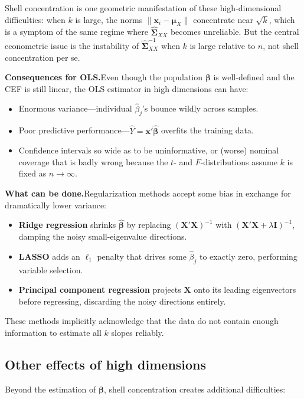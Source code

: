 \documentclass[11pt]{article}
\begin{document}
\medskip\noindent
Shell concentration is one geometric manifestation of these high-dimensional difficulties: when $k$ is large, the norms $\|\bm{x}_i - \bm{\mu}_X\|$ concentrate near $\sqrt{k}$, which is a symptom of the same regime where $\hat{\bm{\Sigma}}_{XX}$ becomes unreliable.  But the central econometric issue is the instability of $\hat{\bm{\Sigma}}_{XX}^{-1}$ when $k$ is large relative to $n$, not shell concentration per se.

\medskip\noindent
\textbf{Consequences for OLS.}\quad Even though the population $\bm{\beta}$ is well-defined and the CEF is still linear, the OLS estimator in high dimensions can have:
\begin{itemize}[leftmargin=2em]
\item Enormous variance---individual $\hat{\beta}_j$'s bounce wildly across samples.
\item Poor predictive performance---$\hat{Y} = \bm{x}'\hat{\bm{\beta}}$ overfits the training data.
\item Confidence intervals so wide as to be uninformative, or (worse) nominal coverage that is badly wrong because the $t$- and $F$-distributions assume $k$ is fixed as $n\to\infty$.
\end{itemize}

\medskip\noindent
\textbf{What can be done.}\quad Regularization methods accept some bias in exchange for dramatically lower variance:
\begin{itemize}[leftmargin=2em]
\item \textbf{Ridge regression} shrinks $\hat{\bm{\beta}}$ by replacing $(\bm{X'X})^{-1}$ with $(\bm{X'X}+\lambda\bm{I})^{-1}$, damping the noisy small-eigenvalue directions.
\item \textbf{LASSO} adds an $\ell_1$ penalty that drives some $\hat{\beta}_j$ to exactly zero, performing variable selection.
\item \textbf{Principal component regression} projects $\bm{X}$ onto its leading eigenvectors before regressing, discarding the noisy directions entirely.
\end{itemize}
These methods implicitly acknowledge that the data do not contain enough information to estimate all $k$ slopes reliably.

\subsection{Other effects of high dimensions}

Beyond the estimation of $\bm{\beta}$, shell concentration creates additional difficulties:
\end{document}
